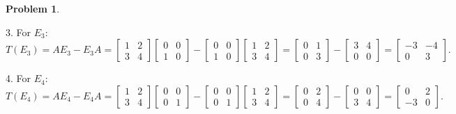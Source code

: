 \documentclass[12pt]{article}
\theoremstyle{definition}
\newtheorem{problem}{Problem}
\begin{document}
\begin{problem}
\begin{solution}
        3. For \( E_3 \):
        \[
        T(E_3) = A E_3 - E_3 A = \begin{bmatrix} 1 & 2 \\ 3 & 4 \end{bmatrix} \begin{bmatrix} 0 & 0 \\ 1 & 0 \end{bmatrix} - \begin{bmatrix} 0 & 0 \\ 1 & 0 \end{bmatrix} \begin{bmatrix} 1 & 2 \\ 3 & 4 \end{bmatrix} = \begin{bmatrix} 0 & 1 \\ 0 & 3 \end{bmatrix} - \begin{bmatrix} 3 & 4 \\ 0 & 0 \end{bmatrix} = \begin{bmatrix} -3 & -4 \\ 0 & 3 \end{bmatrix}.
        \]

        4. For \( E_4 \):
        \[
        T(E_4) = A E_4 - E_4 A = \begin{bmatrix} 1 & 2 \\ 3 & 4 \end{bmatrix} \begin{bmatrix} 0 & 0 \\ 0 & 1 \end{bmatrix} - \begin{bmatrix} 0 & 0 \\ 0 & 1 \end{bmatrix} \begin{bmatrix} 1 & 2 \\ 3 & 4 \end{bmatrix} = \begin{bmatrix} 0 & 2 \\ 0 & 4 \end{bmatrix} - \begin{bmatrix} 0 & 0 \\ 3 & 4 \end{bmatrix} = \begin{bmatrix} 0 & 2 \\ -3 & 0 \end{bmatrix}.
        \]


\end{solution}
\end{problem}
\end{document}

